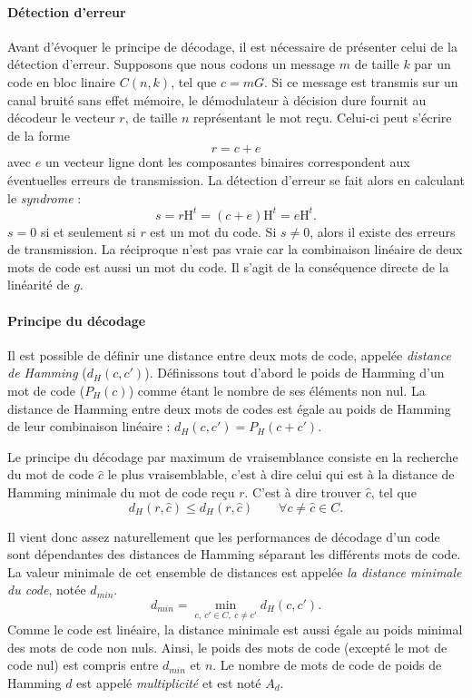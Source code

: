 \paragraph*{Détection d'erreur}
Avant d'évoquer le principe de décodage, il est nécessaire de présenter celui de la détection d'erreur. Supposons que 
nous codons un message $m$ de taille $k$ par un code en bloc linaire $C(n,k)$, tel que $c = mG$. Si ce message est 
transmis sur un canal bruité sans effet mémoire, le démodulateur à décision dure fournit au décodeur le vecteur $r$, de 
taille $n$ représentant le mot reçu. Celui-ci peut s'écrire de la forme \[r=c+e\] avec $e$
un vecteur ligne dont les composantes binaires correspondent aux éventuelles erreurs de transmission. La détection 
d'erreur se fait alors en calculant le \emph{syndrome} : \[s = r\text{H}^t = (c+e)\text{H}^t = e\text{H}^t.\]
$s=0$ si et seulement si $r$  est un mot du code. Si $s \ne 0$, alors il existe des erreurs de transmission. La 
réciproque n'est pas vraie car la combinaison linéaire de deux mots de code est aussi un mot du code. Il s'agit de la 
conséquence directe de la linéarité de $g$.
\paragraph*{Principe du décodage}
Il est possible de définir une distance entre deux mots de code, appelée \emph{distance de Hamming} ($d_H(c, c')$). 
Définissons tout d'abord le poids de Hamming d'un mot de code ($P_H(c)$) comme étant le nombre de ses éléments non nul. 
La distance de Hamming entre deux mots de codes est égale au poids de Hamming de leur combinaison linéaire : 
$d_H(c, c') = P_H(c+c')$.

Le principe du décodage par maximum de vraisemblance consiste en la recherche du mot de code $\hat{c}$ le plus 
vraisemblable, c'est à dire celui qui est à la distance de Hamming minimale du mot de code reçu $r$. C'est à dire trouver 
$\hat{c}$, tel que \[d_H(r,\hat{c}) \leq d_H(r,\hat{c})\qquad \forall c \neq \hat{c} \in C.\]

Il vient donc assez naturellement que les performances de décodage d'un code sont dépendantes des distances de Hamming 
séparant les différents mots de code. La valeur minimale de cet ensemble de distances est appelée \emph{la distance minimale du code}, 
notée $d_{min}$. \[d_{min}=\min\limits_{c,~c'\in C,~c\ne c'}d_H(c, c').\] Comme le code est linéaire, la distance minimale 
est aussi égale au poids minimal des mots de code non nuls. Ainsi, le poids des mots de code (excepté le mot 
de code nul) est compris entre $d_{min}$ et $n$. Le nombre de mots de code de poids de Hamming $d$ est appelé 
\emph{multiplicité} et est noté $A_d$.

